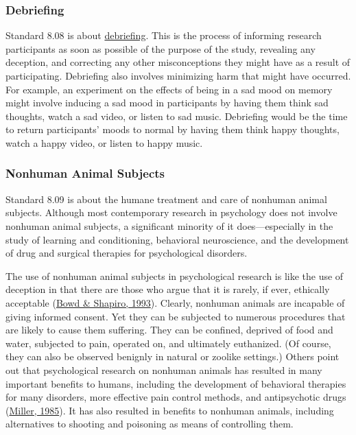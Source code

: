 \documentclass[
]{krantz}
\begin{document}
\hypertarget{debriefing}{%
\subsubsection*{Debriefing}\label{debriefing}}


Standard 8.08 is about \protect\hyperlink{debriefing-1}{debriefing}. This is the process of informing research participants as soon as possible of the purpose of the study, revealing any deception, and correcting any other misconceptions they might have as a result of participating. Debriefing also involves minimizing harm that might have occurred. For example, an experiment on the effects of being in a sad mood on memory might involve inducing a sad mood in participants by having them think sad thoughts, watch a sad video, or listen to sad music. Debriefing would be the time to return participants' moods to normal by having them think happy thoughts, watch a happy video, or listen to happy music.

\hypertarget{nonhuman-animal-subjects}{%
\subsubsection*{Nonhuman Animal Subjects}\label{nonhuman-animal-subjects}}


Standard 8.09 is about the humane treatment and care of nonhuman animal subjects. Although most contemporary research in psychology does not involve nonhuman animal subjects, a significant minority of it does---especially in the study of learning and conditioning, behavioral neuroscience, and the development of drug and surgical therapies for psychological disorders.

The use of nonhuman animal subjects in psychological research is like the use of deception in that there are those who argue that it is rarely, if ever, ethically acceptable (\protect\hyperlink{ref-bowd1993case}{Bowd \& Shapiro, 1993}). Clearly, nonhuman animals are incapable of giving informed consent. Yet they can be subjected to numerous procedures that are likely to cause them suffering. They can be confined, deprived of food and water, subjected to pain, operated on, and ultimately euthanized. (Of course, they can also be observed benignly in natural or zoolike settings.) Others point out that psychological research on nonhuman animals has resulted in many important benefits to humans, including the development of behavioral therapies for many disorders, more effective pain control methods, and antipsychotic drugs (\protect\hyperlink{ref-miller1985value}{Miller, 1985}). It has also resulted in benefits to nonhuman animals, including alternatives to shooting and poisoning as means of controlling them.
\end{document}
